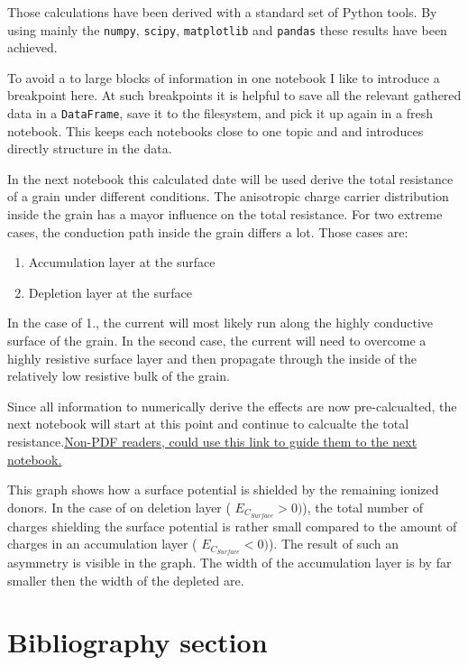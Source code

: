 \documentclass[11pt]{article}
\providecommand{\tightlist}{%
      \setlength{\itemsep}{0pt}\setlength{\parskip}{0pt}}
\begin{document}
Those calculations have been derived with a standard set of Python
tools. By using mainly the \texttt{numpy}, \texttt{scipy},
\texttt{matplotlib} and \texttt{pandas} these results have been
achieved.

To avoid a to large blocks of information in one notebook I like to
introduce a breakpoint here. At such breakpoints it is helpful to save
all the relevant gathered data in a \texttt{DataFrame}, save it to the
filesystem, and pick it up again in a fresh notebook. This keeps each
notebooks close to one topic and and introduces directly structure in
the data.

In the next notebook this calculated date will be used derive the total
resistance of a grain under different conditions. The anisotropic charge
carrier distribution inside the grain has a mayor influence on the total
resistance. For two extreme cases, the conduction path inside the grain
differs a lot. Those cases are:

\begin{enumerate}
\def\labelenumi{\arabic{enumi}.}
\tightlist
\item
  Accumulation layer at the surface
\item
  Depletion layer at the surface
\end{enumerate}

In the case of 1., the current will most likely run along the highly
conductive surface of the grain. In the second case, the current will
need to overcome a highly resistive surface layer and then propagate
through the inside of the relatively low resistive bulk of the grain.

Since all information to numerically derive the effects are now
pre-calcualted, the next notebook will start at this point and continue
to calcualte the total
resistance.\href{./3-Resistance-sensor.ipynb}{Non-PDF readers, could use
this link to guide them to the next notebook.}

    This graph shows how a surface potential is shielded by the remaining
ionized donors. In the case of on deletion layer (
\(E_{C_{Surface}}>0 )\)), the total number of charges shielding the
surface potential is rather small compared to the amount of charges in
an accumulation layer ( \(E_{C_{Surface}}<0 )\)). The result of such an
asymmetry is visible in the graph. The width of the accumulation layer
is by far smaller then the width of the depleted are.

    \hypertarget{bibliography-section}{%
\section{Bibliography section}\label{bibliography-section}}

    



    
    
    
\end{document}
